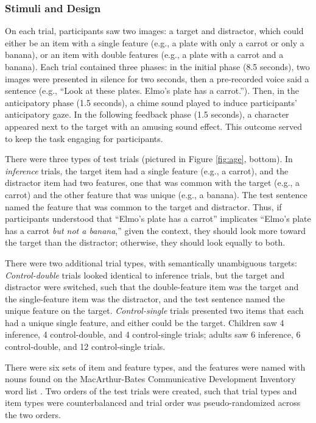 \documentclass[10pt,letterpaper]{article}
\begin{document}
\subsubsection{Stimuli and Design}

On each trial, participants saw two images: a target and distractor, which could either be an item with a single feature (e.g., a plate with only a carrot or only a banana), or an item with double features (e.g., a plate with a carrot and a banana). Each trial contained three phases: in the initial phase (8.5 seconds), two images were presented in silence for two seconds, then a pre-recorded voice said a sentence (e.g., ``Look at these plates. Elmo's plate has a carrot.''). Then, in the anticipatory phase (1.5 seconds), a chime sound played to induce participants' anticipatory gaze. In the following feedback phase (1.5 seconds), a character appeared next to the target with an amusing sound effect. This outcome served to keep the task engaging for participants.

There were three types of test trials (pictured in Figure \ref{fig:age}, bottom). In \emph{inference} trials, the target item had a single feature (e.g., a carrot), and the distractor item had two features, one that was common with the target (e.g., a carrot) and the other feature that was unique (e.g., a banana). The test sentence named the feature that was common to the target and distractor. Thus, if participants understood that ``Elmo's plate has a carrot'' implicates ``Elmo's plate has a carrot \emph{but not a banana},'' given the context, they should look more toward the target than the distractor; otherwise, they should look equally to both.

There were two additional trial types, with semantically unambiguous targets: \emph{Control-double} trials looked identical to inference trials, but the target and distractor were switched, such that the double-feature item was the target and the single-feature item was the distractor, and the test sentence named the unique feature on the target. \emph{Control-single} trials presented two items that each had a unique single feature, and either could be the target. Children saw 4 inference, 4 control-double, and 4 control-single trials; adults saw 6 inference, 6 control-double, and 12 control-single trials. 

There were six sets of item and feature types, and the features were named with nouns found on the  MacArthur-Bates Communicative Development Inventory word list \cite{fenson1994variability}. Two orders of the test trials were created, such that trial types and item types were counterbalanced and trial order was pseudo-randomized across the two orders.
\vspace{12pt}
\end{document}
